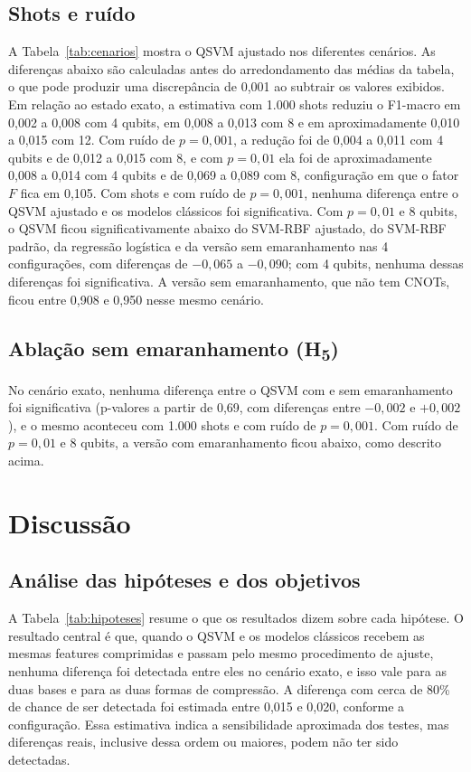 \documentclass[conference]{IEEEtran}
\newcommand{\svm}{\mbox{SVM-RBF}}
\begin{document}
\subsection{Shots e ruído}
A Tabela~\ref{tab:cenarios} mostra o QSVM ajustado nos diferentes cenários. As diferenças abaixo são calculadas antes do arredondamento das médias da tabela, o que pode produzir uma discrepância de 0,001 ao subtrair os valores exibidos. Em relação ao estado exato, a estimativa com 1.000 shots reduziu o F1-macro em 0,002 a 0,008 com 4 qubits, em 0,008 a 0,013 com 8 e em aproximadamente 0,010 a 0,015 com 12. Com ruído de $p = 0{,}001$, a redução foi de 0,004 a 0,011 com 4 qubits e de 0,012 a 0,015 com 8, e com $p = 0{,}01$ ela foi de aproximadamente 0,008 a 0,014 com 4 qubits e de 0,069 a 0,089 com 8, configuração em que o fator $F$ fica em 0,105. Com shots e com ruído de $p = 0{,}001$, nenhuma diferença entre o QSVM ajustado e os modelos clássicos foi significativa. Com $p = 0{,}01$ e 8 qubits, o QSVM ficou significativamente abaixo do \svm{} ajustado, do \svm{} padrão, da regressão logística e da versão sem emaranhamento nas 4 configurações, com diferenças de $-0{,}065$ a $-0{,}090$; com 4 qubits, nenhuma dessas diferenças foi significativa. A versão sem emaranhamento, que não tem CNOTs, ficou entre 0,908 e 0,950 nesse mesmo cenário.



\subsection{Ablação sem emaranhamento (H\textsubscript{5})}
No cenário exato, nenhuma diferença entre o QSVM com e sem emaranhamento foi significativa (p-valores a partir de 0,69, com diferenças entre $-0{,}002$ e $+0{,}002$), e o mesmo aconteceu com 1.000 shots e com ruído de $p = 0{,}001$. Com ruído de $p = 0{,}01$ e 8 qubits, a versão com emaranhamento ficou abaixo, como descrito acima.

\FloatBarrier
\section{Discussão}
\label{sec:discussao}

\subsection{Análise das hipóteses e dos objetivos}
A Tabela~\ref{tab:hipoteses} resume o que os resultados dizem sobre cada hipótese. O resultado central é que, quando o QSVM e os modelos clássicos recebem as mesmas features comprimidas e passam pelo mesmo procedimento de ajuste, nenhuma diferença foi detectada entre eles no cenário exato, e isso vale para as duas bases e para as duas formas de compressão. A diferença com cerca de 80\% de chance de ser detectada foi estimada entre 0,015 e 0,020, conforme a configuração. Essa estimativa indica a sensibilidade aproximada dos testes, mas diferenças reais, inclusive dessa ordem ou maiores, podem não ter sido detectadas.
\end{document}
